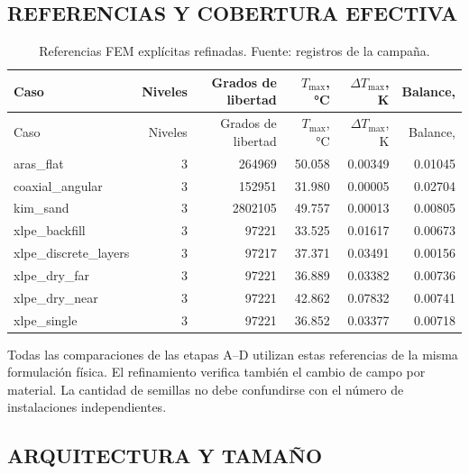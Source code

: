 \subsection{REFERENCIAS Y COBERTURA EFECTIVA}

\begingroup\footnotesize\setlength{\tabcolsep}{3pt}
\begin{longtable}{L{4.2cm}rrrrr}
\caption{Referencias FEM explícitas refinadas. Fuente: registros de la campaña.}\label{tab:explicit-fem}\\
\toprule
Caso & Niveles & Grados de libertad & $T_{\max}$, °C & $\Delta T_{\max}$, K & Balance, \pct{}\\
\midrule\endfirsthead
\toprule
Caso & Niveles & Grados de libertad & $T_{\max}$, °C & $\Delta T_{\max}$, K & Balance, \pct{}\\
\midrule\endhead
aras\_flat & 3 & 264969 & 50.058 & 0.00349 & 0.01045\\
coaxial\_angular & 3 & 152951 & 31.980 & 0.00005 & 0.02704\\
kim\_sand & 3 & 2802105 & 49.757 & 0.00013 & 0.00805\\
xlpe\_backfill & 3 & 97221 & 33.525 & 0.01617 & 0.00673\\
xlpe\_discrete\_layers & 3 & 97217 & 37.371 & 0.03491 & 0.00156\\
xlpe\_dry\_far & 3 & 97221 & 36.889 & 0.03382 & 0.00736\\
xlpe\_dry\_near & 3 & 97221 & 42.862 & 0.07832 & 0.00741\\
xlpe\_single & 3 & 97221 & 36.852 & 0.03377 & 0.00718\\
\bottomrule\end{longtable}\endgroup

Todas las comparaciones de las etapas A--D utilizan estas referencias de la misma formulación física. El refinamiento verifica también el cambio de campo por material. La cantidad de semillas no debe confundirse con el número de instalaciones independientes.

\subsection{ARQUITECTURA Y TAMAÑO}

